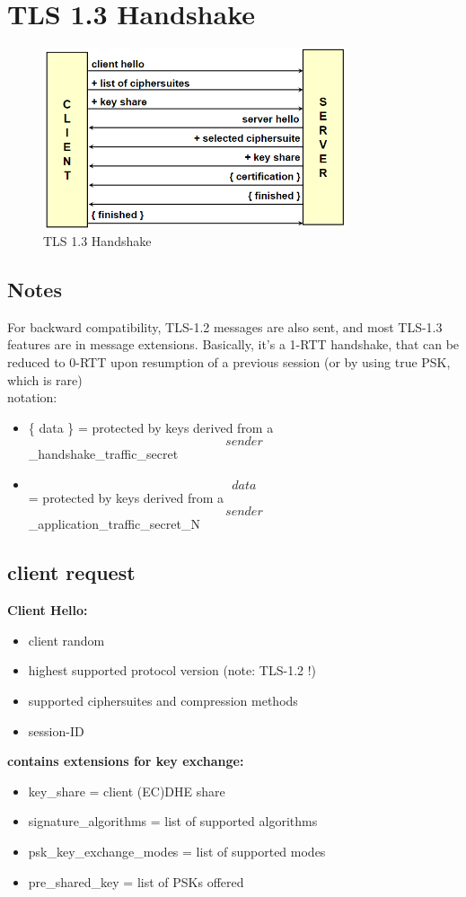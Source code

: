\section{TLS 1.3 Handshake}
\begin{figure}[h!]
    \centering
    \includegraphics[width=0.8\textwidth]{img/handshakeTLS13.png}
    \caption{TLS 1.3 Handshake}
    \label{fig:tls_handshake}
\end{figure}

\subsection{Notes}
For backward compatibility, TLS-1.2 messages are also sent, and most TLS-1.3 features are in message extensions.
Basically, it's a 1-RTT handshake, that can be reduced to 0-RTT upon resumption of a previous session (or by using true PSK, which is rare)
\\
notation:
\begin{itemize}

    \item\{ data \} = protected by keys derived from a \[sender\]\_handshake\_traffic\_secret
    \item \[ data \] = protected by keys derived from a \[sender\]\_application\_traffic\_secret\_N
\end{itemize}

\subsection{client request}
\textbf{Client Hello:}
\begin{itemize}
    \item client random
    \item highest supported protocol version (note: TLS-1.2 !)
    \item supported ciphersuites and compression methods
    \item session-ID
\end{itemize}
\textbf{contains extensions for key exchange:}
\begin{itemize}
    \item key\_share = client (EC)DHE share
    \item signature\_algorithms = list of supported algorithms
    \item psk\_key\_exchange\_modes = list of supported modes
    \item pre\_shared\_key = list of PSKs offered
\end{itemize}

